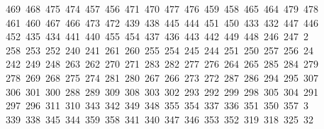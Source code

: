 \begin{tabbing}
\>\ 469\ 468\ 475\ 474\ 457\ 456\ 471\ 470\ 477\ 476\ 459\ 458\ 465\ 464\ 479\ 478\\[0pt]
\>\ 461\ 460\ 467\ 466\ 473\ 472\ 439\ 438\ 445\ 444\ 451\ 450\ 433\ 432\ 447\ 446\ \\[0pt]
\ 452\ 435\ 434\ 441\ 440\ 455\ 454\ 437\ 436\ 443\ 442\ 449\ 448\ 246\ 247\ 2\\[0pt]
\ 258\ 253\ 252\ 240\ 241\ 261\ 260\ 255\ 254\ 245\ 244\ 251\ 250\ 257\ 256\ 24\\[0pt]
\ 242\ 249\ 248\ 263\ 262\ 270\ 271\ 283\ 282\ 277\ 276\ 264\ 265\ 285\ 284\ 279\\[0pt]
\>\ 278\ 269\ 268\ 275\ 274\ 281\ 280\ 267\ 266\ 273\ 272\ 287\ 286\ 294\ 295\ 307\\[0pt]
\>\ 306\ 301\ 300\ 288\ 289\ 309\ 308\ 303\ 302\ 293\ 292\ 299\ 298\ 305\ 304\ 291\ \\[0pt]
\ 297\ 296\ 311\ 310\ 343\ 342\ 349\ 348\ 355\ 354\ 337\ 336\ 351\ 350\ 357\ 3\\[0pt]
\ 339\ 338\ 345\ 344\ 359\ 358\ 341\ 340\ 347\ 346\ 353\ 352\ 319\ 318\ 325\ 32\\[0pt]

\end{tabbing}
